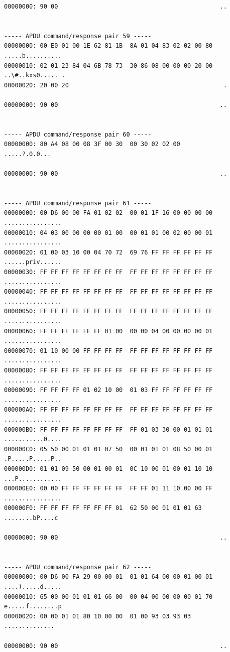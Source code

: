 \documentclass[bsc,frontabs,twoside,singlespacing,parskip,deptreport]{infthesis}     %
\begin{document}
\begin{appendices}
\begin{Verbatim}[commandchars=\\\{\}, fontsize=\small]
00000000: 90 00                                             ..


----- APDU command/response pair 59 -----
00000000: 00 E0 01 00 1E 62 81 1B  8A 01 04 83 02 02 00 80  .....b..........
00000010: 02 01 23 84 04 6B 78 73  30 86 08 00 00 00 20 00  ..\#..kxs0..... .
00000020: 20 00 20                                           . 

00000000: 90 00                                             ..


----- APDU command/response pair 60 -----
00000000: 80 A4 08 00 08 3F 00 30  00 30 02 02 00           .....?.0.0...

00000000: 90 00                                             ..


----- APDU command/response pair 61 -----
00000000: 00 D6 00 00 FA 01 02 02  00 01 1F 16 00 00 00 00  ................
00000010: 04 03 00 00 00 00 01 00  00 01 01 00 02 00 00 01  ................
00000020: 01 00 03 10 00 04 70 72  69 76 FF FF FF FF FF FF  ......priv......
00000030: FF FF FF FF FF FF FF FF  FF FF FF FF FF FF FF FF  ................
00000040: FF FF FF FF FF FF FF FF  FF FF FF FF FF FF FF FF  ................
00000050: FF FF FF FF FF FF FF FF  FF FF FF FF FF FF FF FF  ................
00000060: FF FF FF FF FF FF 01 00  00 00 04 00 00 00 00 01  ................
00000070: 01 10 00 00 FF FF FF FF  FF FF FF FF FF FF FF FF  ................
00000080: FF FF FF FF FF FF FF FF  FF FF FF FF FF FF FF FF  ................
00000090: FF FF FF FF 01 02 10 00  01 03 FF FF FF FF FF FF  ................
000000A0: FF FF FF FF FF FF FF FF  FF FF FF FF FF FF FF FF  ................
000000B0: FF FF FF FF FF FF FF FF  FF 01 03 30 00 01 01 01  ...........0....
000000C0: 05 50 00 01 01 01 07 50  00 01 01 01 08 50 00 01  .P.....P.....P..
000000D0: 01 01 09 50 00 01 00 01  0C 10 00 01 00 01 10 10  ...P............
000000E0: 00 00 FF FF FF FF FF FF  FF FF 01 11 10 00 00 FF  ................
000000F0: FF FF FF FF FF FF FF 01  62 50 00 01 01 01 63     ........bP....c

00000000: 90 00                                             ..


----- APDU command/response pair 62 -----
00000000: 00 D6 00 FA 29 00 00 01  01 01 64 00 00 01 00 01  ....).....d.....
00000010: 65 00 00 01 01 01 66 00  00 04 00 00 00 00 01 70  e.....f........p
00000020: 00 00 01 01 80 10 00 00  01 00 93 03 93 03        ..............

00000000: 90 00                                             ..



\end{Verbatim}
\end{appendices}
\end{document}
